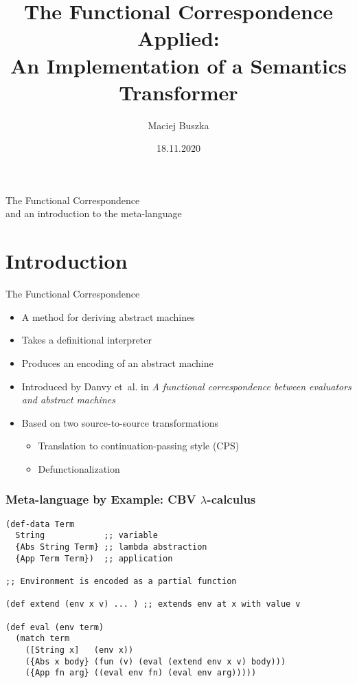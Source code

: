\documentclass[handout]{beamer}
\title[The Functional Correspondence Applied]{The Functional Correspondence Applied:\\ An Implementation of a Semantics Transformer}
\author[Maciej Buszka]{Maciej Buszka}
\institute[II UWr]{Instytut Informatyki UWr}
\date{18.11.2020}
\newcommand{\LC}{\(\lambda\)-calculus}
\begin{document}
\begin{frame}
  \titlepage
\end{frame}

\begin{frame}
  \centering
  \LARGE{The Functional Correspondence}\\
  \tiny{and an introduction to the meta-language}
\end{frame}



\section{Introduction}
\begin{frame}{The Functional Correspondence}
  \begin{itemize}
    \item A method for deriving abstract machines\pause
    \item Takes a definitional interpreter
    \item Produces an encoding of an abstract machine\pause
    \item Introduced by Danvy et~al. in \textit{A functional correspondence between evaluators and abstract machines}
    \pause
    \item Based on two source-to-source transformations \pause
    \begin{itemize}
      \item Translation to continuation-passing style (CPS)
      \item Defunctionalization
    \end{itemize}
  \end{itemize}
\end{frame}

\begin{frame}[fragile]
  \frametitle{Meta-language by Example: CBV \LC{}}
  \begin{lstlisting}
(def-data Term
  String            ;; variable
  {Abs String Term} ;; lambda abstraction
  {App Term Term})  ;; application

;; Environment is encoded as a partial function

(def extend (env x v) ... ) ;; extends env at x with value v

(def eval (env term)
  (match term
    ([String x]   (env x))
    ({Abs x body} (fun (v) (eval (extend env x v) body)))
    ({App fn arg} ((eval env fn) (eval env arg)))))
  \end{lstlisting}
\end{frame}
\end{document}
